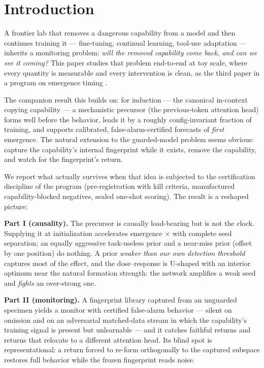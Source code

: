 \documentclass[11pt]{article}
\begin{document}
\section{Introduction}
A frontier lab that removes a dangerous capability from a model and then continues
training it --- fine-tuning, continual learning, tool-use adaptation --- inherits a
monitoring problem: \emph{will the removed capability come back, and can we see it
coming?} This paper studies that problem end-to-end at toy scale, where every quantity
is measurable and every intervention is clean, as the third paper in a program on
emergence timing \citep{companion2026a,companion2026d}.

The companion result this builds on: for induction --- the canonical in-context copying
capability \citep{olsson2022context} --- a mechanistic precursor (the previous-token
attention head) forms well before the behavior, leads it by a roughly config-invariant
fraction of training, and supports calibrated, false-alarm-certified forecasts of
\emph{first} emergence. The natural extension to the guarded-model problem seems
obvious: capture the capability's internal fingerprint while it exists, remove the
capability, and watch for the fingerprint's return.

We report what actually survives when that idea is subjected to the certification
discipline of the program (pre-registration with kill criteria, manufactured
capability-blocked negatives, sealed one-shot scoring). The result is a reshaped
picture:

\textbf{Part I (causality).} The precursor is causally load-bearing but is not the
clock. Supplying it at initialization accelerates emergence \PsevenSpeedup$\times$
with complete seed separation; an equally aggressive task-useless prior and a
near-miss prior (offset by one position) do nothing. A prior \emph{weaker than our own
detection threshold} captures most of the effect, and the dose--response is U-shaped
with an interior optimum near the natural formation strength: the network amplifies a
weak seed and \emph{fights} an over-strong one.

\textbf{Part II (monitoring).} A fingerprint library captured from an unguarded
specimen yields a monitor with certified false-alarm behavior --- silent on omission
and on an adversarial matched-data stream in which the capability's training signal is
present but unlearnable --- and it catches faithful returns and returns that relocate
to a different attention head. Its blind spot is representational: a return forced to
re-form orthogonally to the captured subspace restores full behavior while the frozen
fingerprint reads noise.
\end{document}
